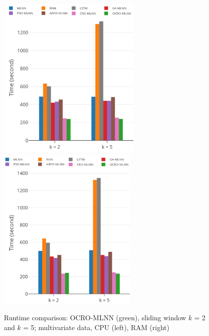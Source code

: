 \documentclass[smallcondensed, natbib]{svjour3}     %
\begin{document}
{\begin{figure}
	\centering
	\begin{minipage}[t]{1.0\textwidth}
		\centering
		\includegraphics[width=0.45\textwidth =0cm 0cm 0cm 0cm, height = 8cm]{images/pdf/time/time_cpu.pdf}
		\centering
		\includegraphics[width=0.45\textwidth =0cm 0cm 0cm 0cm, height = 8cm]{images/pdf/time/time_ram.pdf}
	\end{minipage}
	\caption{Runtime comparison: OCRO-MLNN (green), sliding window $k$ = 2 and $k$ = 5; multivariate data, CPU (left), RAM (right)} 
	\label{fig:speed_system_multivariate}
\end{figure}

}
\end{document}
